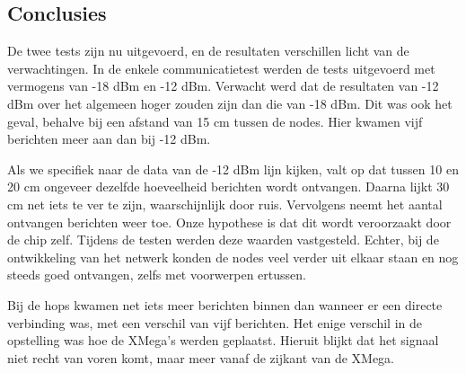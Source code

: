 \subsection{Conclusies}
De twee tests zijn nu uitgevoerd, en de resultaten verschillen licht van de verwachtingen. In de enkele communicatietest werden de tests uitgevoerd met vermogens van -18 dBm en -12 dBm. Verwacht werd dat de resultaten van -12 dBm over het algemeen hoger zouden zijn dan die van -18 dBm. Dit was ook het geval, behalve bij een afstand van 15 cm tussen de nodes. Hier kwamen vijf berichten meer aan dan bij -12 dBm.

Als we specifiek naar de data van de -12 dBm lijn kijken, valt op dat tussen 10 en 20 cm ongeveer dezelfde hoeveelheid berichten wordt ontvangen. Daarna lijkt 30 cm net iets te ver te zijn, waarschijnlijk door ruis. Vervolgens neemt het aantal ontvangen berichten weer toe. Onze hypothese is dat dit wordt veroorzaakt door de chip zelf. Tijdens de testen werden deze waarden vastgesteld. Echter, bij de ontwikkeling van het netwerk konden de nodes veel verder uit elkaar staan en nog steeds goed ontvangen, zelfs met voorwerpen ertussen.

Bij de hops kwamen net iets meer berichten binnen dan wanneer er een directe verbinding was, met een verschil van vijf berichten. Het enige verschil in de opstelling was hoe de XMega's werden geplaatst. Hieruit blijkt dat het signaal niet recht van voren komt, maar meer vanaf de zijkant van de XMega.


